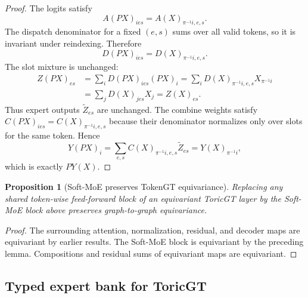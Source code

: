 \documentclass[11pt]{article}
\theoremstyle{definition}
\theoremstyle{plain}
\newtheorem{proposition}[definition]{Proposition}
\theoremstyle{remark}
\numberwithin{equation}{section}
\begin{document}
\begin{proof}
The logits satisfy
\begin{equation}
  A(PX)_{i e s}=A(X)_{\pi^{-1}i,e,s}.
\end{equation}
The dispatch denominator for a fixed $(e,s)$ sums over all valid tokens, so it is invariant under reindexing.  Therefore
\begin{equation}
  D(PX)_{i e s}=D(X)_{\pi^{-1}i,e,s}.
\end{equation}
The slot mixture is unchanged:
\begin{align}
  Z(PX)_{e s}
    &=\sum_i D(PX)_{i e s}(PX)_i
      =\sum_i D(X)_{\pi^{-1}i,e,s}X_{\pi^{-1}i}\nonumber\\
    &=\sum_j D(X)_{j e s}X_j
      =Z(X)_{e s}.
\end{align}
Thus expert outputs $\widetilde Z_{e s}$ are unchanged.  The combine weights satisfy $C(PX)_{i e s}=C(X)_{\pi^{-1}i,e,s}$ because their denominator normalizes only over slots for the same token.  Hence
\begin{equation}
  Y(PX)_i=\sum_{e,s}C(X)_{\pi^{-1}i,e,s}\widetilde Z_{e s}=Y(X)_{\pi^{-1}i},
\end{equation}
which is exactly $PY(X)$.
\end{proof}

\begin{proposition}[Soft-MoE preserves TokenGT equivariance]
Replacing any shared token-wise feed-forward block of an equivariant ToricGT layer by the Soft-MoE block above preserves graph-to-graph equivariance.
\end{proposition}

\begin{proof}
The surrounding attention, normalization, residual, and decoder maps are equivariant by earlier results.  The Soft-MoE block is equivariant by the preceding lemma.  Compositions and residual sums of equivariant maps are equivariant.
\end{proof}

\subsection{Typed expert bank for ToricGT}
\end{document}
